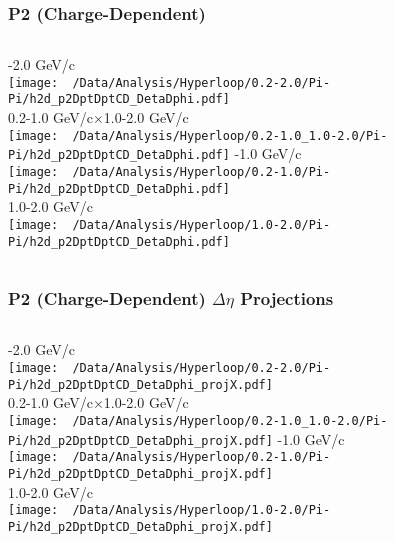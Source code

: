 \documentclass{beamer}
\begin{document}
\begin{frame}
	\frametitle{P2 (Charge-Dependent)}
	\begin{columns}
		-2.0 GeV/c\\
		\texttt{[image: ~/Data/Analysis/Hyperloop/0.2-2.0/Pi-Pi/h2d\_p2DptDptCD\_DetaDphi.pdf]}\\0.2-1.0 GeV/c$\times$1.0-2.0 GeV/c\\
		\texttt{[image: ~/Data/Analysis/Hyperloop/0.2-1.0\_1.0-2.0/Pi-Pi/h2d\_p2DptDptCD\_DetaDphi.pdf]}
		-1.0 GeV/c\\
		\texttt{[image: ~/Data/Analysis/Hyperloop/0.2-1.0/Pi-Pi/h2d\_p2DptDptCD\_DetaDphi.pdf]}\\1.0-2.0 GeV/c\\
		\texttt{[image: ~/Data/Analysis/Hyperloop/1.0-2.0/Pi-Pi/h2d\_p2DptDptCD\_DetaDphi.pdf]}
	\end{columns}
\end{frame}
\begin{frame}
	\frametitle{P2 (Charge-Dependent) $\Delta\eta$ Projections}
	\begin{columns}
		\column{0.5\textwidth}
		-2.0 GeV/c\\
		\texttt{[image: ~/Data/Analysis/Hyperloop/0.2-2.0/Pi-Pi/h2d\_p2DptDptCD\_DetaDphi\_projX.pdf]}\\0.2-1.0 GeV/c$\times$1.0-2.0 GeV/c\\
		\texttt{[image: ~/Data/Analysis/Hyperloop/0.2-1.0\_1.0-2.0/Pi-Pi/h2d\_p2DptDptCD\_DetaDphi\_projX.pdf]}
		\column{0.5\textwidth}
		-1.0 GeV/c\\
		\texttt{[image: ~/Data/Analysis/Hyperloop/0.2-1.0/Pi-Pi/h2d\_p2DptDptCD\_DetaDphi\_projX.pdf]}\\1.0-2.0 GeV/c\\
		\texttt{[image: ~/Data/Analysis/Hyperloop/1.0-2.0/Pi-Pi/h2d\_p2DptDptCD\_DetaDphi\_projX.pdf]}
	\end{columns}
\end{frame}
\end{document}
